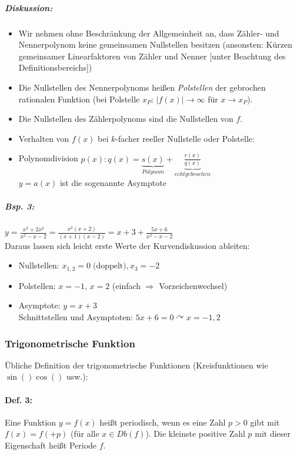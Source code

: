 \subparagraph{Diskussion:}
\begin{itemize}
\item Wir nehmen ohne Beschränkung der Allgemeinheit an, dass Zähler- und Nennerpolynom keine gemeinsamen Nullstellen besitzen (ansonsten: Kürzen gemeinsamer Linearfaktoren von Zähler und Nenner [unter Beachtung des Definitionsbereichs])
\item Die Nullstellen des Nennerpolynoms heißen \emph{Polstellen} der gebrochen rationalen Funktion (bei Polstelle $x_P$: $|f(x)|\rightarrow \infty$ für $x\rightarrow x_P$).
\item Die Nullstellen des Zählerpolynoms sind die Nullstellen von $f$.
\item Verhalten von $f(x)$ bei $k$-facher reeller Nullstelle oder Polstelle:\\
\item Polynomdivision $p(x): q(x) = \underbrace{s(x)}_{Polynom}+\underbrace{\frac{r(x)}{q(x)}}_{echt gebrochen}$\\
$y=a(x)$ ist die sogenannte Asymptote
\end{itemize}
\subparagraph{Bsp. 3:}\parskp
$y=\frac{x^3+2x^2}{x^2-x-2}=\frac{x^2(x+2)}{(x+1)(x-2)}=x+3+\frac{5x+6}{x^2-x-2}$\\
Daraus lassen sich leicht erste Werte der Kurvendiskussion ableiten:
\begin{itemize}
\item Nullstellen: $x_{1,2}=0\; \text{(doppelt)}, x_3=-2$
\item Polstellen: $x=-1,\, x=2$ (einfach $\Rightarrow$ Vorzeichenwechsel)
\item Asymptote: $y=x+3$\\
Schnittstellen und Asymptoten: $5x+6=0 \curvearrowright x=-1,2$
\end{itemize}
\subsubsection{Trigonometrische Funktion}
Übliche Definition der trigonometrische Funktionen (Kreisfunktionen wie $\sin() \cos()$ usw.):
\paragraph{Def. 3:} \parskp
Eine Funktion $y=f(x)$ heißt periodisch, wenn es eine Zahl $p>0$ gibt mit $f(x)=f(+p)$ (für alle $x \in Db(f)$). Die kleinste positive Zahl $p$ mit dieser Eigenschaft heißt Periode $f$.

